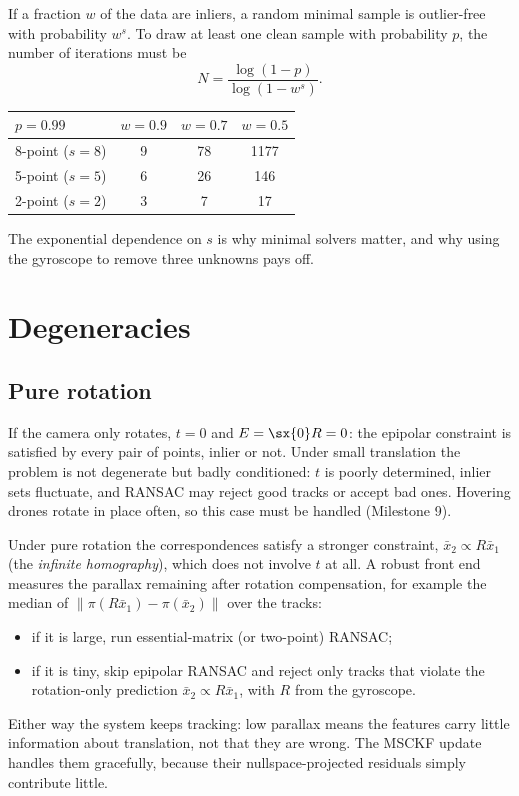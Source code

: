 If a fraction $w$ of the data are inliers, a random minimal sample is outlier-free with probability $w^s$. To draw at
least one clean sample with probability $p$, the number of iterations must be
\begin{equation}
  N = \frac{\log(1 - p)}{\log(1 - w^s)} .
  \label{eq:ransac-n}
\end{equation}
\begin{center}\small
\begin{tabular}{@{}l c c c@{}}
\toprule
$p = 0.99$ & $w = 0.9$ & $w = 0.7$ & $w = 0.5$ \\
\midrule
8-point ($s = 8$) & 9 & 78 & 1177 \\
5-point ($s = 5$) & 6 & 26 & 146 \\
2-point ($s = 2$) & 3 & 7 & 17 \\
\bottomrule
\end{tabular}
\end{center}
The exponential dependence on $s$ is why minimal solvers matter, and why using the gyroscope to remove three
unknowns pays off.

\section{Degeneracies}

\subsection{Pure rotation}

If the camera only rotates, $t = 0$ and $E = \sx{0}R = 0$: the epipolar constraint is satisfied by every pair of points,
inlier or not. Under small translation the problem is not degenerate but badly conditioned: $t$ is poorly determined,
inlier sets fluctuate, and RANSAC may reject good tracks or accept bad ones. Hovering drones rotate in place often,
so this case must be handled (Milestone 9).

Under pure rotation the correspondences satisfy a stronger constraint, $\bar x_2 \propto R\bar x_1$ (the \emph{infinite homography}),
which does not involve $t$ at all. A robust front end measures the parallax remaining after rotation compensation,
for example the median of $\|\pi(R\bar x_1) - \pi(\bar x_2)\|$ over the tracks:
\begin{itemize}
  \item if it is large, run essential-matrix (or two-point) RANSAC;
  \item if it is tiny, skip epipolar RANSAC and reject only tracks that violate the rotation-only prediction
        $\bar x_2 \propto R\bar x_1$, with $R$ from the gyroscope.
\end{itemize}
Either way the system keeps tracking: low parallax means the features carry little information about translation,
not that they are wrong. The MSCKF update handles them gracefully, because their nullspace-projected residuals
simply contribute little.

